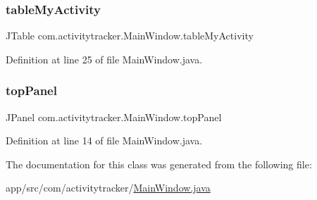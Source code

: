 \subsubsection{\texorpdfstring{table\+My\+Activity}{tableMyActivity}}
{\footnotesize\ttfamily J\+Table com.\+activitytracker.\+Main\+Window.\+table\+My\+Activity\hspace{0.3cm}{\ttfamily [private]}}



Definition at line 25 of file Main\+Window.\+java.

\mbox{\label{classcom_1_1activitytracker_1_1_main_window_a6baf76b2b8ede1ba82fc6d096ddb580b}} 
\subsubsection{\texorpdfstring{top\+Panel}{topPanel}}
{\footnotesize\ttfamily J\+Panel com.\+activitytracker.\+Main\+Window.\+top\+Panel\hspace{0.3cm}{\ttfamily [private]}}



Definition at line 14 of file Main\+Window.\+java.



The documentation for this class was generated from the following file\+:\begin{DoxyCompactItemize}
\item 
app/src/com/activitytracker/\mbox{\hyperlink{_main_window_8java}{Main\+Window.\+java}}\end{DoxyCompactItemize}
